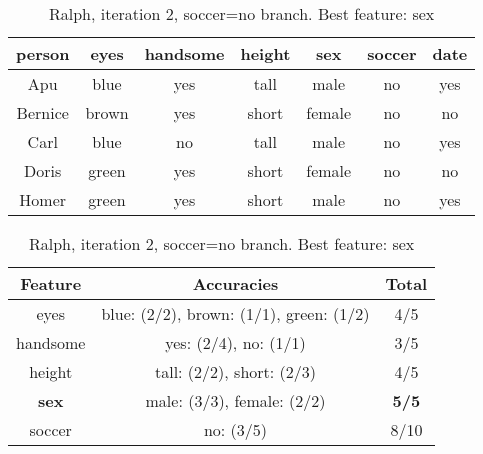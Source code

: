 \begin{table}[h!]
  \centering
  \begin{tabular}{cccccc|c}
    \toprule
    person      & eyes  & handsome & height & sex    & soccer & date\\
    \midrule
    Apu         & blue  & yes      & tall   & male   & no     & yes \\
    Bernice     & brown & yes      & short  & female & no     & no  \\
    Carl        & blue  & no       & tall   & male   & no     & yes \\
    Doris       & green & yes      & short  & female & no     & no  \\
    Homer       & green & yes      & short  & male   & no     & yes \\
    \bottomrule
  \end{tabular}

  \vspace{.5cm}

  \begin{tabular}{ccc}
    \toprule
    Feature      & Accuracies                              & Total\\
    \midrule
    eyes         & blue: (2/2), brown: (1/1), green: (1/2) & 4/5\\
    handsome     & yes: (2/4), no: (1/1)                   & 3/5\\
    height       & tall: (2/2), short: (2/3)               & 4/5\\
    \textbf{sex} & male: (3/3), female: (2/2)              & \textbf{5/5}\\
    soccer       & no: (3/5)                               & 8/10\\
    \bottomrule
  \end{tabular}
  \caption*{Ralph, iteration 2, soccer=no branch. Best feature: sex}
\end{table}

